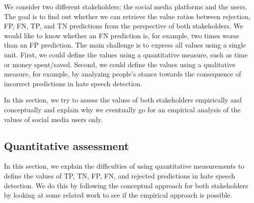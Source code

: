 %
We consider two different stakeholders: the social media platforms and the users.
%
The goal is to find out whether we can retrieve the value ratios between rejection, FP, FN, TP, and TN predictions from the perspective of both stakeholders.
%
We would like to know whether an FN prediction is, for example, two times worse than an FP prediction.
%
The main challenge is to express all values using a single unit.
%
First, we could define the values using a quantitative measure, such as time or money spent/saved.
%
Second, we could define the values using a qualitative measure, for example, by analyzing people's stance towards the consequence of incorrect predictions in hate speech detection.
%

%
In this section, we try to assess the values of both stakeholders empirically and conceptually and explain why we eventually go for an empirical analysis of the values of social media users only.
%

\subsection{Quantitative assessment}
\label{sec:quantitative-assessment}
%
%
%
%
%
%
%
%
%
%
%
%

In this section, we explain the difficulties of using quantitative measurements to define the values of TP, TN, FP, FN, and rejected predictions in hate speech detection.
%
We do this by following the conceptual approach for both stakeholders by looking at some related work to see if the empirical approach is possible.
%

